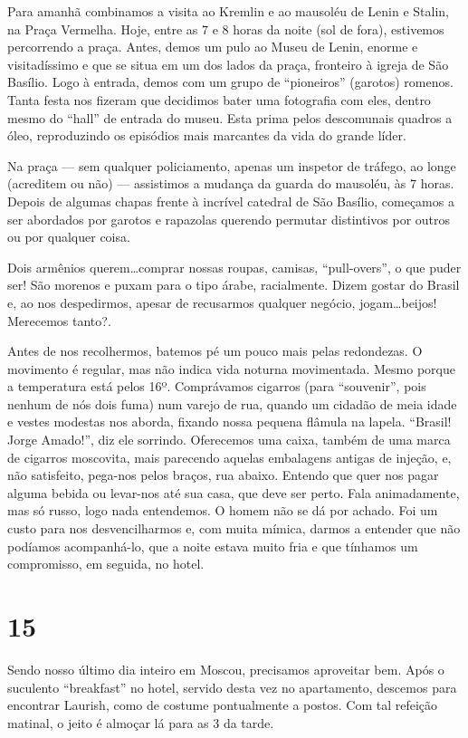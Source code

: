 Para amanhã combinamos a visita ao Kremlin e ao mausoléu de Lenin e Stalin, na Praça Vermelha. Hoje, entre as 7 e 8 horas da noite (sol de fora), estivemos percorrendo a praça. Antes, demos um pulo ao Museu de Lenin, enorme e visitadíssimo e que se situa em um dos lados da praça, fronteiro à igreja de São Basílio. Logo à entrada, demos com um grupo de ``pioneiros'' (garotos) romenos. Tanta festa nos fizeram que decidimos bater uma fotografia com eles, dentro mesmo do ``hall'' de entrada do museu. Esta prima pelos descomunais quadros a óleo, reproduzindo os episódios mais marcantes da vida do grande líder.

Na praça --- sem qualquer policiamento, apenas um inspetor de tráfego, ao longe (acreditem ou não) --- assistimos a mudança da guarda do mausoléu, às 7 horas. Depois de algumas chapas frente à incrível catedral de São Basílio, começamos a ser abordados por garotos e rapazolas querendo permutar distintivos por outros ou por qualquer coisa.

Dois armênios querem\ldots comprar nossas roupas, camisas, ``pull-overs'', o que puder ser! São morenos e puxam para o tipo árabe, racialmente. Dizem gostar do Brasil e, ao nos despedirmos, apesar de recusarmos qualquer negócio, jogam\ldots beijos! Merecemos tanto?.

Antes de nos recolhermos, batemos pé um pouco mais pelas redondezas. O movimento é regular, mas não indica vida noturna movimentada. Mesmo porque a temperatura está pelos 16º. Comprávamos cigarros (para ``souvenir'', pois nenhum de nós dois fuma) num varejo de rua, quando um cidadão de meia idade e vestes modestas nos aborda, fixando nossa pequena flâmula na lapela. ``Brasil! Jorge Amado!'', diz ele sorrindo. Oferecemos uma caixa, também de uma marca de cigarros moscovita, mais parecendo aquelas embalagens antigas de injeção, e, não satisfeito, pega-nos pelos braços, rua abaixo. Entendo que quer nos pagar alguma bebida ou levar-nos até sua casa, que deve ser perto. Fala animadamente, mas só russo, logo nada entendemos. O homem não se dá por achado. Foi um custo para nos desvencilharmos e, com muita mímica, darmos a entender que não podíamos acompanhá-lo, que a noite estava muito fria e que tínhamos um compromisso, em seguida, no hotel.

\section*{15 \adfflatleafright {}}
Sendo nosso último dia inteiro em Moscou, precisamos aproveitar bem. Após o suculento ``breakfast'' no hotel, servido desta vez no apartamento, descemos para encontrar Laurish, como de costume pontualmente a postos. Com tal refeição matinal, o jeito é almoçar lá para as 3 da tarde.

